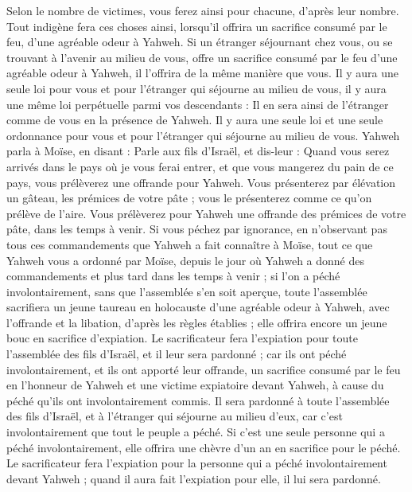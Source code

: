 \begin{multicols}{2}
Selon le nombre de victimes, vous ferez ainsi pour chacune, d’après leur nombre.
Tout indigène fera ces choses ainsi, lorsqu’il offrira un sacrifice consumé par le feu, d’une agréable odeur à Yahweh.
Si un étranger séjournant chez vous, ou se trouvant à l’avenir au milieu de vous, offre un sacrifice consumé par le feu d’une agréable odeur à Yahweh, il l’offrira de la même manière que vous.
Il y aura une seule loi pour vous et pour l'étranger qui séjourne au milieu de vous, il y aura une même loi perpétuelle parmi vos descendants : Il en sera ainsi de l'étranger comme de vous en la présence de Yahweh.
Il y aura une seule loi et une seule ordonnance pour vous et pour l'étranger qui séjourne au milieu de vous.
Yahweh parla à Moïse, en disant :
Parle aux fils d'Israël, et dis-leur : Quand vous serez arrivés dans le pays où je vous ferai entrer,
et que vous mangerez du pain de ce pays, vous prélèverez une offrande pour Yahweh.
Vous présenterez par élévation un gâteau, les prémices de votre pâte ; vous le présenterez comme ce qu’on prélève de l'aire.
Vous prélèverez pour Yahweh une offrande des prémices de votre pâte, dans les temps à venir.
Si vous péchez par ignorance, en n’observant pas tous ces commandements que Yahweh a fait connaître à Moïse,
tout ce que Yahweh vous a ordonné par Moïse, depuis le jour où Yahweh a donné des commandements et plus tard dans les temps à venir ;
si l’on a péché involontairement, sans que l'assemblée s’en soit aperçue, toute l'assemblée sacrifiera un jeune taureau en holocauste d’une agréable odeur à Yahweh, avec l’offrande et la libation, d’après les règles établies ; elle offrira encore un jeune bouc en sacrifice d’expiation.
Le sacrificateur fera l’expiation pour toute l'assemblée des fils d'Israël, et il leur sera pardonné ; car ils ont péché involontairement, et ils ont apporté leur offrande, un sacrifice consumé par le feu en l’honneur de Yahweh et une victime expiatoire devant Yahweh, à cause du péché qu’ils ont involontairement commis.
Il sera pardonné à toute l'assemblée des fils d'Israël, et à l'étranger qui séjourne au milieu d’eux, car c’est involontairement que tout le peuple a péché.
Si c’est une seule personne qui a péché involontairement, elle offrira une chèvre d'un an en sacrifice pour le péché.
Le sacrificateur fera l’expiation pour la personne qui a péché involontairement devant Yahweh ; quand il aura fait l’expiation pour elle, il lui sera pardonné.

\end{multicols}
